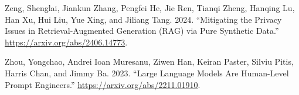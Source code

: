\documentclass[
  12pt,
  a4paper,
]{article}
\newlength{\cslhangindent}
\newenvironment{CSLReferences}[2] %
 {\begin{list}{}{%
  \setlength{\itemindent}{0pt}
  \setlength{\leftmargin}{0pt}
  \setlength{\parsep}{0pt}
  \ifodd #1
   \setlength{\leftmargin}{\cslhangindent}
   \setlength{\itemindent}{-1\cslhangindent}
  \fi
  \setlength{\itemsep}{#2\baselineskip}}}
 {\end{list}}
\begin{document}
\begin{CSLReferences}{1}{0}
Zeng, Shenglai, Jiankun Zhang, Pengfei He, Jie Ren, Tianqi Zheng,
Hanqing Lu, Han Xu, Hui Liu, Yue Xing, and Jiliang Tang. 2024.
{``Mitigating the Privacy Issues in Retrieval-Augmented Generation (RAG)
via Pure Synthetic Data.''} \url{https://arxiv.org/abs/2406.14773}.

Zhou, Yongchao, Andrei Ioan Muresanu, Ziwen Han, Keiran Paster, Silviu
Pitis, Harris Chan, and Jimmy Ba. 2023. {``Large Language Models Are
Human-Level Prompt Engineers.''} \url{https://arxiv.org/abs/2211.01910}.

\end{CSLReferences}
\end{document}
